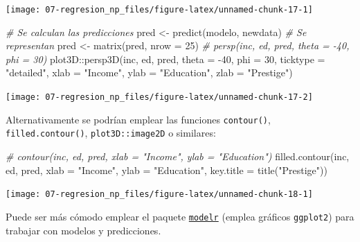 \documentclass[
]{book}
\newenvironment{Shaded}{\begin{snugshade}}{\end{snugshade}}
\newcommand{\AttributeTok}[1]{\textcolor[rgb]{0.77,0.63,0.00}{#1}}
\newcommand{\CommentTok}[1]{\textcolor[rgb]{0.56,0.35,0.01}{\textit{#1}}}
\newcommand{\DecValTok}[1]{\textcolor[rgb]{0.00,0.00,0.81}{#1}}
\newcommand{\FunctionTok}[1]{\textcolor[rgb]{0.00,0.00,0.00}{#1}}
\newcommand{\NormalTok}[1]{#1}
\newcommand{\OtherTok}[1]{\textcolor[rgb]{0.56,0.35,0.01}{#1}}
\newcommand{\SpecialCharTok}[1]{\textcolor[rgb]{0.00,0.00,0.00}{#1}}
\newcommand{\StringTok}[1]{\textcolor[rgb]{0.31,0.60,0.02}{#1}}
\theoremstyle{break}
\theoremstyle{definition}
\theoremstyle{definition}
\theoremstyle{definition}
\theoremstyle{definition}
\theoremstyle{remark}
\begin{document}
\begin{center}\texttt{[image: 07-regresion\_np\_files/figure-latex/unnamed-chunk-17-1]} \end{center}

\begin{Shaded}
\begin{Highlighting}[]
\CommentTok{\# Se calculan las predicciones}
\NormalTok{pred }\OtherTok{\textless{}{-}} \FunctionTok{predict}\NormalTok{(modelo, newdata)}
\CommentTok{\# Se representan}
\NormalTok{pred }\OtherTok{\textless{}{-}} \FunctionTok{matrix}\NormalTok{(pred, }\AttributeTok{nrow =} \DecValTok{25}\NormalTok{)}
\CommentTok{\# persp(inc, ed, pred, theta = {-}40, phi = 30)}
\NormalTok{plot3D}\SpecialCharTok{::}\FunctionTok{persp3D}\NormalTok{(inc, ed, pred, }\AttributeTok{theta =} \SpecialCharTok{{-}}\DecValTok{40}\NormalTok{, }\AttributeTok{phi =} \DecValTok{30}\NormalTok{, }\AttributeTok{ticktype =} \StringTok{"detailed"}\NormalTok{,}
                \AttributeTok{xlab =} \StringTok{"Income"}\NormalTok{, }\AttributeTok{ylab =} \StringTok{"Education"}\NormalTok{, }\AttributeTok{zlab =} \StringTok{"Prestige"}\NormalTok{)}
\end{Highlighting}
\end{Shaded}

\begin{center}\texttt{[image: 07-regresion\_np\_files/figure-latex/unnamed-chunk-17-2]} \end{center}

Alternativamente se podrían emplear las funciones \texttt{contour()}, \texttt{filled.contour()}, \texttt{plot3D::image2D} o similares:

\begin{Shaded}
\begin{Highlighting}[]
\CommentTok{\# contour(inc, ed, pred, xlab = "Income", ylab = "Education")}
\FunctionTok{filled.contour}\NormalTok{(inc, ed, pred, }\AttributeTok{xlab =} \StringTok{"Income"}\NormalTok{, }\AttributeTok{ylab =} \StringTok{"Education"}\NormalTok{, }\AttributeTok{key.title =} \FunctionTok{title}\NormalTok{(}\StringTok{"Prestige"}\NormalTok{))}
\end{Highlighting}
\end{Shaded}

\begin{center}\texttt{[image: 07-regresion\_np\_files/figure-latex/unnamed-chunk-18-1]} \end{center}

Puede ser más cómodo emplear el paquete \href{https://modelr.tidyverse.org}{\texttt{modelr}} (emplea gráficos \texttt{ggplot2}) para trabajar con modelos y predicciones.
\end{document}
